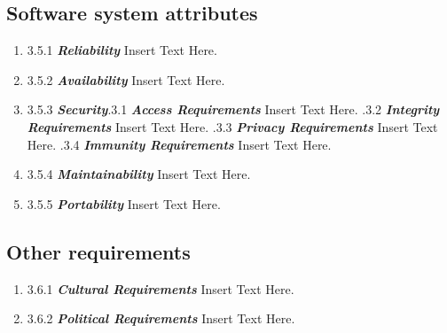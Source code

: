 \documentclass [12pt]{article}
\begin{document}
\subsection{Software system attributes} 
				\begin {enumerate}
					\item [{3.5.1}] 	\textbf {\textit {Reliability}}\newline 
						Insert Text Here.
					\item [{3.5.2}] 	\textbf {\textit {Availability}}\newline
						Insert Text Here.
					\item [{3.5.3}] 	\textbf {\textit {Security}}.3.1   \textbf {\textit { Access Requirements }} \newline
								Insert Text Here. .3.2	\textbf {\textit { Integrity Requirements }} \newline
								Insert Text Here. .3.3	\textbf {\textit { Privacy Requirements }} \newline
								Insert Text Here. .3.4 	\textbf {\textit { Immunity Requirements  }} \newline
								Insert Text Here.
					\item [{3.5.4}] 	\textbf {\textit {Maintainability}}\newline
						Insert Text Here.
					\item [{3.5.5}] 	\textbf {\textit {Portability}}\newline
						Insert Text Here. \newline

				\end {enumerate}
\subsection{Other requirements} 
				\begin {enumerate}
				\item [{3.6.1}]\textbf {\textit { Cultural Requirements }} \newline
		Insert Text Here.

		 \item [{3.6.2}] \textbf {\textit { Political Requirements }} \newline
		Insert Text Here.\newline
		\end {enumerate}
\end{document}
